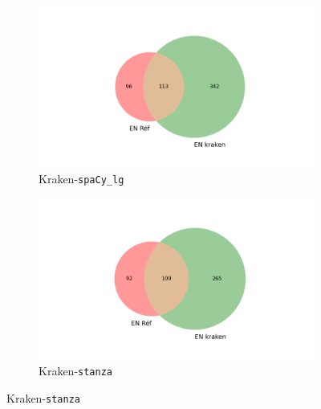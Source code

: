 \begin{figure}
\begin{minipage}{7cm}
  \begin{subfigure}{0.99\textwidth}
  \includegraphics[width=.99\textwidth]{IMAGES/ELTeC_INTERSECTIONS_spaCy3.5.1/DAUDET_petit-chose_Kraken-base.txt_spacy-lg-concat.json_intersection.png} 
  \caption{Kraken-\texttt{spaCy\_lg}}
  \label{fig:DAUDET_spacy-lg_intersection}
  \end{subfigure}
  \end{minipage}
  \begin{minipage}{7cm}
  \begin{subfigure}{0.99\textwidth}
  \includegraphics[width=.99\textwidth]{IMAGES/ELTeC_INTERSECTIONS_stanza/DAUDET_petit-chose_Kraken-base.txt_stanza-concat.json_intersection.png}
   \caption{Kraken-\texttt{stanza}}
 

\end{subfigure}
\end{minipage}
\end{figure}
